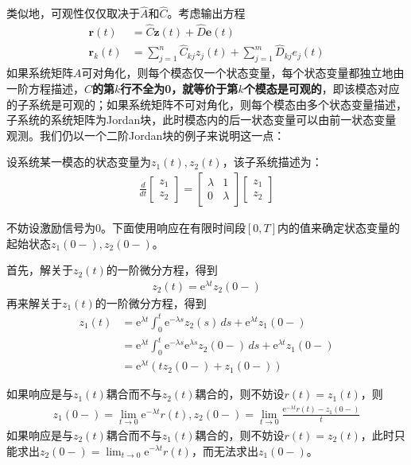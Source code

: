 类似地，可观性仅仅取决于$\hat{A}$和$\hat{C}$。考虑输出方程\begin{align*}
    \mathbf{r}(t)&=\hat{C}\mathbf{z}(t)+\hat{D}\mathbf{e}(t)\\
    \mathbf{r}_k(t)&=\sum_{j=1}^n \hat{C}_{kj} z_j(t)+\sum_{j=1}^m \hat{D}_{kj} e_j(t)
\end{align*}
如果系统矩阵$A$可对角化，则每个模态仅一个状态变量，每个状态变量都独立地由一阶方程描述，\textbf{$\hat{C}$的第$k$行不全为0，就等价于第$k$个模态是可观的}，即该模态对应的子系统是可观的；如果系统矩阵不可对角化，则每个模态由多个状态变量描述，子系统的系统矩阵为Jordan块，此时模态内的后一状态变量可以由前一状态变量观测。我们仍以一个二阶Jordan块的例子来说明这一点：
\begin{example}
    设系统某一模态的状态变量为$z_1(t),z_2(t)$，该子系统描述为：\begin{align*}
    \frac{d}{dt}\begin{bmatrix}
    z_1\\
    z_2
    \end{bmatrix}=\begin{bmatrix}
    \lambda & 1\\
    0 & \lambda
    \end{bmatrix}\begin{bmatrix}
    z_1\\
    z_2
    \end{bmatrix}
    \end{align*}

    不妨设激励信号为0。下面使用响应在有限时间段$[0,T]$内的值来确定状态变量的起始状态$z_1(0-),z_2(0-)$。

    首先，解关于$z_2(t)$的一阶微分方程，得到\begin{align*}
    z_2(t)=\mathrm{e}^{\lambda t}z_2(0-)
    \end{align*}
    再来解关于$z_1(t)$的一阶微分方程，得到\begin{align*}
    z_1(t)&=\mathrm{e}^{\lambda t}\int_0^t \mathrm{e}^{-\lambda s}z_2(s)\,ds+\mathrm{e}^{\lambda t}z_1(0-)\\
    &=\mathrm{e}^{\lambda t}\int_0^t \mathrm{e}^{-\lambda s}\mathrm{e}^{\lambda s}z_2(0-)\,ds+\mathrm{e}^{\lambda t}z_1(0-)\\
    &=\mathrm{e}^{\lambda t}(tz_2(0-)+z_1(0-))
    \end{align*}

    如果响应是与$z_1(t)$耦合而不与$z_2(t)$耦合的，则不妨设$r(t)=z_1(t)$，则\begin{align*}
    z_1(0-)=\lim_{t\to 0} \mathrm{e}^{-\lambda t}r(t),z_2(0-)=\lim_{t\to 0} \frac{\mathrm{e}^{-\lambda t}r(t)-z_1(0-)}{t}
    \end{align*}
    如果响应是与$z_2(t)$耦合而不与$z_1(t)$耦合的，则不妨设$r(t)=z_2(t)$，此时只能求出$z_2(0-)=\lim_{t\to 0} \mathrm{e}^{-\lambda t}r(t)$，而无法求出$z_1(0-)$。
\end{example}

